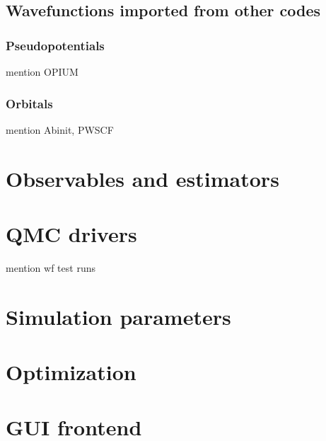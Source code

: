 \subsection{Wavefunctions imported from other codes}
\subsubsection{Pseudopotentials}
mention OPIUM
\subsubsection{Orbitals}
mention Abinit, PWSCF
\section{Observables and estimators}
\section{QMC drivers}
mention wf test runs
\section{Simulation parameters}
\section{Optimization}
\section{GUI frontend}


